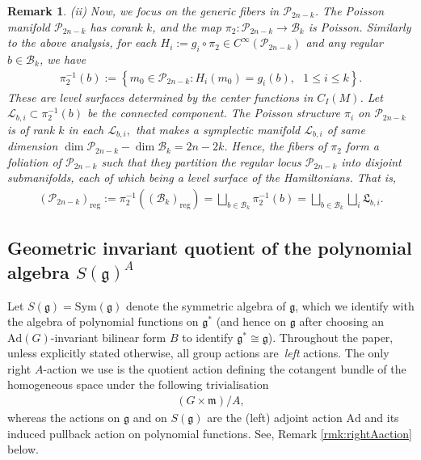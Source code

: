 \documentclass[11pt]{amsart}
\theoremstyle{definition}
\theoremstyle{plain}
\newtheorem{remark}[theorem]{Remark}
\theoremstyle{conclusion}
\begin{document}
\begin{remark}
(ii) Now, we focus on the generic fibers in $\mathcal{P}_{2n-k}$.  The Poisson manifold $\mathcal{P}_{2n-k}$ has corank $k$, and the map $\pi_2: \mathcal{P}_{2n-k} \rightarrow \mathcal{B}_k$ is Poisson.  Similarly to the above analysis, for each $H_i := g_i \circ \pi_2 \in C^\infty(\mathcal{P}_{2n-k}) $ and any regular $b \in \mathcal{B}_k$, we have \begin{align}
        \pi_2^{-1}(b) :=\left\{ m_0 \in \mathcal{P}_{2n-k}: H_i (m_0) = g_i(b), \text{ } 1 \leq i \leq k\right\}. \label{eq:fiberpi2}
\end{align} These are level surfaces determined by the center functions in $C_I(M)$. Let $\mathcal{L}_{b,i} \subset \pi_2^{-1}(b)$ be the connected component. The Poisson structure $\pi_i$ on $\mathcal{P}_{2n-k}$ is of rank $k$ in each $\mathcal{L}_{b,i},$ that makes a symplectic manifold $\mathcal{L}_{b,i}$ of same dimension $ \dim \mathcal{P}_{2n-k} - \dim \mathcal{B}_k = 2n - 2k$. Hence, the fibers of $\pi_2$ form a foliation of $\mathcal{P}_{2n-k}$ such that they partition the regular locus $\mathcal{P}_{2n-k}$ into disjoint submanifolds, each of which being a level surface of the Hamiltonians. That is, \begin{align}
    \left(\mathcal{P}_{2n-k}\right)_{\mathrm{reg}} := \pi_2^{-1}\left((\mathcal{B}_k)_{\mathrm{reg}}\right) = \bigsqcup_{b \in \mathcal{B}_k} \pi_2^{-1}(b) =\bigsqcup_{b \in \mathcal{B}_k} \bigsqcup_i \mathfrak{L}_{b,i}.
\end{align} %
\end{remark}

 

 

  

\subsection{Geometric invariant quotient of the polynomial algebra \texorpdfstring{$S(\mathfrak{g})^A$}{S(g)\^{}A}}
\label{subsec:geomi}
Let $S(\mathfrak{g})=\mathrm{Sym}(\mathfrak{g})$ denote the symmetric algebra of $\mathfrak{g}$, which we identify with the algebra of polynomial functions on $\mathfrak{g}^*$ (and hence on $\mathfrak{g}$ after choosing an $\mathrm{Ad}(G)$-invariant bilinear form $B$ to identify $\mathfrak{g}^*\cong\mathfrak{g}$). Throughout the paper, unless explicitly stated otherwise, all group actions are \,\emph{left} actions. The only right $A$-action we use is the quotient action defining the cotangent bundle of the homogeneous space under the following trivialisation \begin{align*}
    (G\times \mathfrak{m})/A,
\end{align*}
whereas the actions on $\mathfrak{g}$ and on $S(\mathfrak{g})$ are the (left) adjoint action $\mathrm{Ad}$ and its induced pullback action on polynomial functions. See, Remark \ref{rmk:rightAaction} below.
\end{document}
